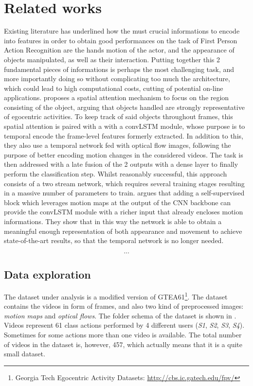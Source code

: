 \documentclass[10pt,twocolumn,hidelinks,letterpaper]{article}
\begin{document}
\section{Related works}
Existing literature has underlined how the must crucial informations to encode into features in order to obtain good performances on the task of First Person Action Recognition are the hands motion of the actor, and the appearance of objects manipulated, as well as their interaction. Putting together this 2 fundamental pieces of informations is perhaps the most challenging task, and more importantly doing so without complicating too much the architecture, which could lead to high computational costs, cutting of potential on-line applications. \cite{egornn} proposes a spatial attention mechanism to focus on the region consisting of the object, arguing that objects handled are strongly representative of egocentric activities. To keep track of said objects throughout frames, this spatial attention is paired with a with a convLSTM module, whose purpose is to temporal encode the frame-level features formerly extracted. In addition to this, they also use a temporal network fed with optical flow images, following the purpose of better encoding motion changes in the considered videos. The task is then addressed with a late fusion of the 2 outputs with a dense layer to finally perform the classification step. Whilst reasonably successful, this approach consists of a two stream network, which requires several training stages
resulting in a massive number of parameters to train. \cite{sparnet} argues that adding a self-supervised block which leverages motion maps at the output of the CNN backbone can provide the convLSTM module with a richer input that already encloses motion informations. They show that in this way the network is able to obtain a meaningful enough representation of both appearance and movement to achieve state-of-the-art results, so that the temporal network is no longer needed. \cite{reprflow} \cite{motfilt}

\[...\]

\subsection{Data exploration}

The dataset under analysis is a modified version of GTEA61\footnote{Georgia Tech Egocentric Activity Datasets: \small{\url{http://cbs.ic.gatech.edu/fpv/}}}. The dataset contains the videos in form of frames, and also two kind of preprocessed images: \textit{motion maps} and \textit{optical flows}. The folder schema of the dataset is shown in . Videos represent 61 class actions performed by 4 different users (\textit{S1}, \textit{S2}, \textit{S3}, \textit{S4}). Sometimes for some actions more than one video is available. The total number of videos in the dataset is, however, 457, which actually means that it is a quite small dataset.
\end{document}
